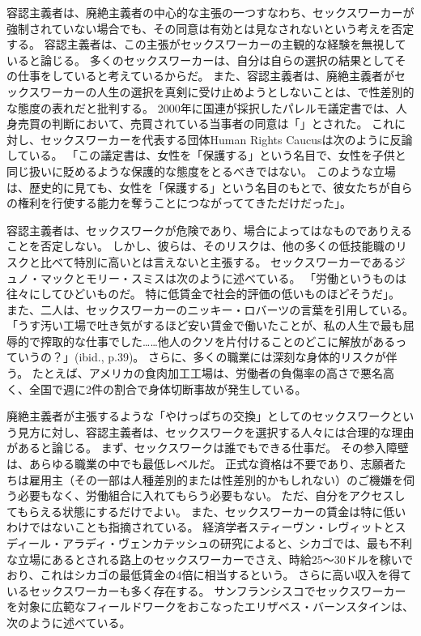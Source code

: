 \documentclass[paper=a4,book,openany]{jlreq} \usepackage{mystyle}
\begin{document}
容認主義者は、廃絶主義者の中心的な主張の一つ{\DDASH}すなわち、セックスワーカーが強制されていない場合でも、その同意は有効とは見なされない{\DDASH}という考えを否定する。
容認主義者は、この主張がセックスワーカーの主観的な経験を無視していると論じる。
多くのセックスワーカーは、自分は自らの選択の結果としてその仕事をしていると考えているからだ。
また、容認主義者は、廃絶主義者がセックスワーカーの人生の選択を真剣に受け止めようとしないことは、で性差別的な態度の表れだと批判する。
2000年に国連が採択したパレルモ議定書では、人身売買の判断において、売買されている当事者の同意は「」とされた。
これに対し、セックスワーカーを代表する団体Human Rights Caucusは次のように反論している。
「この議定書は、女性を「保護する」という名目で、女性を子供と同じ扱いに貶めるような保護的な態度をとるべきではない。
このような立場は、歴史的に見ても、女性を「保護する」という名目のもとで、彼女たちが自らの権利を行使する能力を奪うことにつながっててきただけだった」\citep{caucus99:_recom_commen_draft_protoc_combat}。

容認主義者は、セックスワークが危険であり、場合によってはなものでありえることを否定しない。
しかし、彼らは、そのリスクは、他の多くの低技能職のリスクと比べて特別に高いとは言えないと主張する。
セックスワーカーであるジュノ・マックとモリー・スミスは次のように述べている。
「労働というものは往々にしてひどいものだ。
特に低賃金で社会的評価の低いものほどそうだ」\citep[p.43]{mac18:_revol_prost}。
また、二人は、セックスワーカーのニッキー・ロバーツの言葉を引用している。
「うす汚い工場で吐き気がするほど安い賃金で働いたことが、私の人生で最も屈辱的で搾取的な仕事でした……他人のクソを片付けることのどこに解放があるっていうの？」(ibid., p.39)。
さらに、多くの職業には深刻な身体的リスクが伴う。
たとえば、アメリカの食肉加工工場は、労働者の負傷率の高さで悪名高く、全国で週に2件の割合で身体切断事故が発生している\citep{wasley18:_two_amput_week}。

廃絶主義者が主張するような「やけっぱちの交換」としてのセックスワークという見方に対し、容認主義者は、セックスワークを選択する人々には合理的な理由があると論じる。
まず、セックスワークは誰でもできる仕事だ。
その参入障壁は、あらゆる職業の中でも最低レベルだ。
正式な資格は不要であり、志願者たちは雇用主（その一部は人種差別的または性差別的かもしれない）のご機嫌を伺う必要もなく、労働組合に入れてもらう必要もない。
ただ、自分をアクセスしてもらえる状態にするだけでよい。
また、セックスワーカーの賃金は特に低いわけではないことも指摘されている。
経済学者スティーヴン・レヴィットとスディール・アラディ・ヴェンカテッシュの研究によると、シカゴでは、最も不利な立場にあるとされる路上のセックスワーカーでさえ、時給25～30ドルを稼いでおり、これはシカゴの最低賃金の4倍に相当するという\citep[p.26]{levitt07:_empir_analy_street_level_prost}。
さらに高い収入を得ているセックスワーカーも多く存在する。
サンフランシスコでセックスワーカーを対象に広範なフィールドワークをおこなったエリザベス・バーンスタインは、次のように述べている。
\end{document}
